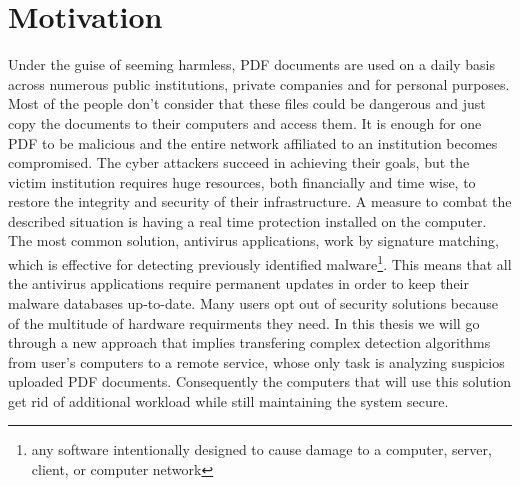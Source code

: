 \section{Motivation}
\label{section:motivation}
Under the guise of seeming harmless, PDF documents are used on a daily basis across numerous public institutions, private companies and for personal purposes. Most of the people don't consider that these files could be dangerous and just copy the documents to their computers and access them. It is enough for one PDF to be malicious and the entire network affiliated to an institution becomes compromised. The cyber attackers succeed in achieving their goals, but the victim institution requires huge resources, both financially and time wise, to restore the integrity and security of their infrastructure. A measure to combat the described situation is having a real time protection installed on the computer. The most common solution, antivirus applications, work by signature matching, which is effective for detecting previously identified malware\footnote{any software intentionally designed to cause damage to a computer, server, client, or computer network}. This means that all the antivirus applications require permanent updates in order to keep their malware databases up-to-date. Many users opt out of security solutions because of 
the multitude of hardware requirments they need. In this thesis we will go through a new approach that implies transfering complex detection algorithms from user's computers to a remote service, whose only task is analyzing suspicios uploaded PDF documents. Consequently the computers that will use this solution get rid of additional workload while still maintaining the system secure.



